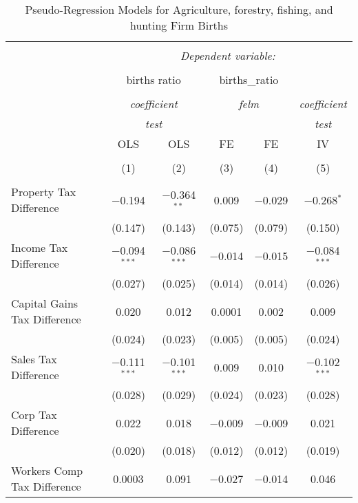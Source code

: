 
\begin{table}[!htbp] \centering 
  \caption{Pseudo-Regression Models for  Agriculture, forestry, fishing, and hunting Firm Births} 
  \label{} 
\begin{tabular}{@{\extracolsep{5pt}}lccccc} 
\\[-1.8ex]\hline 
\hline \\[-1.8ex] 
 & \multicolumn{5}{c}{\textit{Dependent variable:}} \\ 
\cline{2-6} 
\\[-1.8ex] & \multicolumn{2}{c}{births ratio} & \multicolumn{2}{c}{births\_ratio} &   \\ 
\\[-1.8ex] & \multicolumn{2}{c}{\textit{coefficient}} & \multicolumn{2}{c}{\textit{felm}} & \textit{coefficient} \\ 
 & \multicolumn{2}{c}{\textit{test}} & \multicolumn{2}{c}{\textit{}} & \textit{test} \\ 
 & OLS & OLS & FE & FE & IV \\ 
\\[-1.8ex] & (1) & (2) & (3) & (4) & (5)\\ 
\hline \\[-1.8ex] 
 Property Tax Difference & $-$0.194 & $-$0.364$^{**}$ & 0.009 & $-$0.029 & $-$0.268$^{*}$ \\ 
  & (0.147) & (0.143) & (0.075) & (0.079) & (0.150) \\ 
  Income Tax Difference & $-$0.094$^{***}$ & $-$0.086$^{***}$ & $-$0.014 & $-$0.015 & $-$0.084$^{***}$ \\ 
  & (0.027) & (0.025) & (0.014) & (0.014) & (0.026) \\ 
  Capital Gains Tax Difference & 0.020 & 0.012 & 0.0001 & 0.002 & 0.009 \\ 
  & (0.024) & (0.023) & (0.005) & (0.005) & (0.024) \\ 
  Sales Tax Difference & $-$0.111$^{***}$ & $-$0.101$^{***}$ & 0.009 & 0.010 & $-$0.102$^{***}$ \\ 
  & (0.028) & (0.029) & (0.024) & (0.023) & (0.028) \\ 
  Corp Tax Difference & 0.022 & 0.018 & $-$0.009 & $-$0.009 & 0.021 \\ 
  & (0.020) & (0.018) & (0.012) & (0.012) & (0.019) \\ 
  Workers Comp Tax Difference & 0.0003 & 0.091 & $-$0.027 & $-$0.014 & 0.046 \\ 

\end{tabular}
\end{table}
